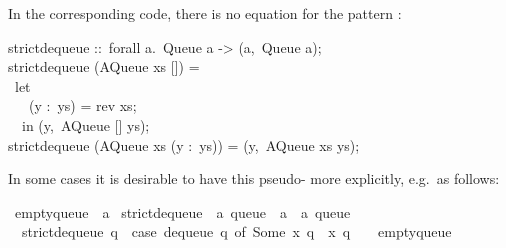 \begin{isabellebody}
%
\begin{isamarkuptext}%
\noindent In the corresponding code, there is no equation
  for the pattern :%
\end{isamarkuptext}%
\isamarkuptrue%
%
\isadelimquote
%
\endisadelimquote
%
\isatagquote
%
\begin{isamarkuptext}%
\isatypewriter%
\noindent%
\hspace*{0pt}strict{}dequeue ::~forall a.~Queue a -> (a,~Queue a);\\
\hspace*{0pt}strict{}dequeue (AQueue xs []) =\\
\hspace*{0pt} ~let {}\\
\hspace*{0pt} ~~~(y :~ys) = rev xs;\\
\hspace*{0pt} ~{}~in (y,~AQueue [] ys);\\
\hspace*{0pt}strict{}dequeue (AQueue xs (y :~ys)) = (y,~AQueue xs ys);%
\end{isamarkuptext}%
\isamarkuptrue%
%
\endisatagquote
{\isafoldquote}%
%
\isadelimquote
%
\endisadelimquote
%
\begin{isamarkuptext}%
\noindent In some cases it is desirable to have this
  pseudo- more explicitly, e.g.~as follows:%
\end{isamarkuptext}%
\isamarkuptrue%
%
\isadelimquote
%
\endisadelimquote
%
\isatagquote
{}\isamarkupfalse%
\ empty{\isacharunderscore}queue\ {\isacharcolon}{\isacharcolon}\ {\isacharprime}a\isanewline
\isanewline
{}\isamarkupfalse%
\ strict{\isacharunderscore}dequeue{\isacharprime}\ {\isacharcolon}{\isacharcolon}\ {\isachardoublequoteopen}{\isacharprime}a\ queue\ {\isasymRightarrow}\ {\isacharprime}a\ {\isasymtimes}\ {\isacharprime}a\ queue{\isachardoublequoteclose}\ \isanewline
\ \ {\isachardoublequoteopen}strict{\isacharunderscore}dequeue{\isacharprime}\ q\ {\isacharequal}\ {\isacharparenleft}case\ dequeue\ q\ of\ {\isacharparenleft}Some\ x{\isacharcomma}\ q{\isacharprime}{\isacharparenright}\ {\isasymRightarrow}\ {\isacharparenleft}x{\isacharcomma}\ q{\isacharprime}{\isacharparenright}\ {\isacharbar}\ {\isacharunderscore}\ {\isasymRightarrow}\ empty{\isacharunderscore}queue{\isacharparenright}{\isachardoublequoteclose}\isanewline

\end{isabellebody}

